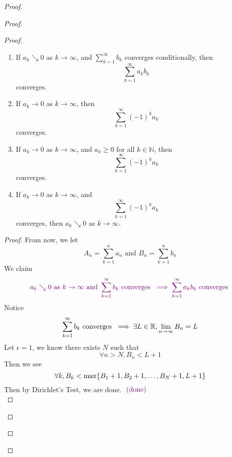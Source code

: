 \documentclass{report}
\begin{document}
\begin{proof}
\begin{proof}
\begin{proof}
\begin{question}{}{}
\begin{enumerate}
    \item If \( a_k \searrow 0 \) as \( k \to \infty \), and  $\sum_{k=1}^{\infty} b_k$ converges conditionally, then 
    \[
    \sum_{k=1}^{\infty} a_kb_k
    \]
    converges.
    
    \item If \( a_k \to 0 \) as \( k \to \infty \), then 
    \[
    \sum_{k=1}^{\infty} (-1)^k a_k
    \]
    converges.
    
    \item If \( a_k \to 0 \) as \( k \to \infty \), and \( a_k \geq 0 \) for all \( k \in \mathbb{N} \), then 
    \[
    \sum_{k=1}^{\infty} (-1)^k a_k
    \]
    converges.
    
    \item If \( a_k \to 0 \) as \( k \to \infty \), and 
    \[
    \sum_{k=1}^{\infty} (-1)^k a_k
    \]
    converges, then \( a_k \searrow 0 \) as \( k \to \infty \).
\end{enumerate}
\end{question}
\begin{proof}
From now, we let 
\begin{equation}
A_n=\sum_{k=1}^n a_n\text{ and }B_n=\sum_{k=1}^n b_n
\end{equation}
We claim
\begin{equation}
  \textcolor{violet}{a_k\searrow 0\text{ as $k\to \infty$ and }\sum_{k=1}^\infty b_k\text{ converges }\implies \sum_{k=1}^\infty a_kb_k\text{ converges }}
\end{equation}
Notice 
\begin{equation}
\sum_{k=1}^\infty b_k\text{ converges }\implies \exists L\in\mathbb{R}, \lim_{n\to\infty}B_n=L
\end{equation}
Let $\epsilon =1$, we know there exists $N$ such that  
\begin{equation}
\forall n>N, B_n<L+1
\end{equation}
Then we see 
\begin{equation}
\forall k, B_k<\max \{ B_1+1,B_2+1,\dots ,B_{N}+1,L+1 \}
\end{equation}
Then by Dirichlet's Test, we are done. $\textcolor{violet}{\text{ (done) }}$\\


\end{proof}
\end{proof}
\end{proof}
\end{proof}
\end{document}
